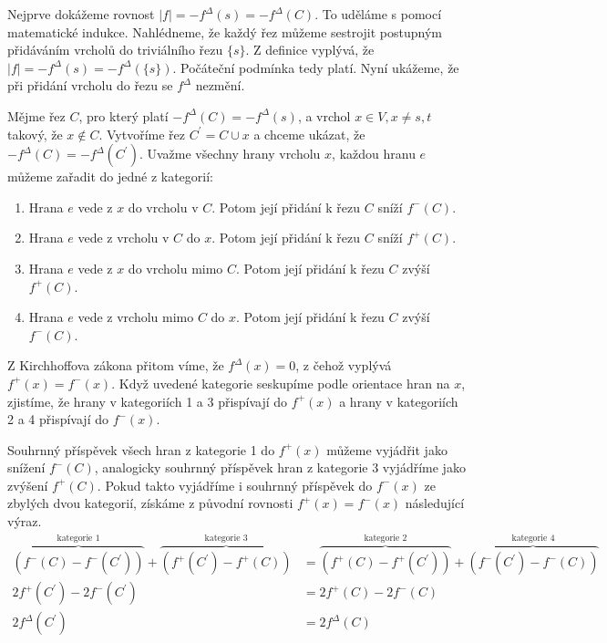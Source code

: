 \begin{t_proof}
  Nejprve dokážeme rovnost $|f|=-f^\Delta(s)=-f^\Delta(C)$. To uděláme s pomocí matematické indukce. Nahlédneme, že každý řez můžeme sestrojit postupným přidáváním vrcholů do triviálního řezu $\{s\}$. Z definice vyplývá, že $|f|=-f^\Delta(s)=-f^\Delta(\{s\})$. Počáteční podmínka tedy platí. Nyní ukážeme, že při přidání vrcholu do řezu se $f^\Delta$ nezmění.
  
  Mějme řez $C$, pro který platí $-f^\Delta(C)=-f^\Delta(s)$, a vrchol $x\in V, x\neq s, t$ takový, že $x\notin C$. Vytvoříme řez $C^\prime=C\cup x$ a chceme ukázat, že $-f^\Delta(C)=-f^\Delta(C^\prime)$. Uvažme všechny hrany vrcholu $x$, každou hranu $e$ můžeme zařadit do jedné z kategorií:
  \begin{enumerate}
    \item Hrana $e$ vede z $x$ do vrcholu v $C$. Potom její přidání k řezu $C$ sníží $f^-(C)$.
    \item Hrana $e$ vede z vrcholu v $C$ do $x$. Potom její přidání k řezu $C$ sníží $f^+(C)$.
    \item Hrana $e$ vede z $x$ do vrcholu mimo $C$. Potom její přidání k řezu $C$ zvýší $f^+(C)$.
    \item Hrana $e$ vede z vrcholu mimo $C$ do $x$. Potom její přidání k řezu $C$ zvýší $f^-(C)$.
  \end{enumerate}
  
  Z Kirchhoffova zákona přitom víme, že $f^\Delta(x)=0$, z čehož vyplývá $f^+(x)=f^-(x)$. Když uvedené kategorie seskupíme podle orientace hran na $x$, zjistíme, že hrany v kategoriích 1 a 3 přispívají do $f^+(x)$ a hrany v kategoriích 2 a 4 přispívají do $f^-(x)$.
  
  Souhrnný příspěvek všech hran z kategorie 1 do $f^+(x)$ můžeme vyjádřit jako snížení $f^-(C)$, analogicky souhrnný příspěvek hran z kategorie 3 vyjádříme jako zvýšení $f^+(C)$. Pokud takto vyjádříme i souhrnný příspěvek do $f^-(x)$ ze zbylých dvou kategorií, získáme z původní rovnosti $f^+(x)=f^-(x)$ následující výraz.
  \begin{align*}
    \overbrace{(f^-(C)-f^-(C^\prime))}^{\textrm{kategorie 1}}+\overbrace{(f^+(C^\prime)-f^+(C))}^{\textrm{kategorie 3}}&=
    \overbrace{(f^+(C)-f^+(C^\prime))}^{\textrm{kategorie 2}}+\overbrace{(f^-(C^\prime)-f^-(C))}^{\textrm{kategorie 4}}\\
    2f^+(C^\prime)-2f^-(C^\prime)&=2f^+(C)-2f^-(C)\\
    2f^\Delta(C^\prime)&=2f^\Delta(C)
  \end{align*}
  

\end{t_proof}
